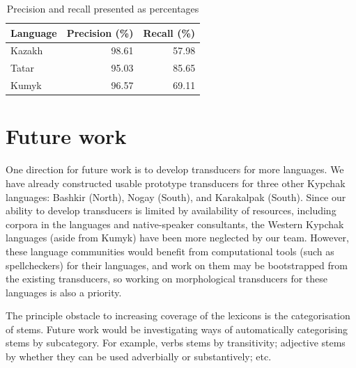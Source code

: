 \documentclass[a4paper,11pt,twocolumn]{article}
\begin{document}


\begin{table}
\begin{center}
	\begin{tabular}{lrr}
	\toprule
		\textbf{Language} & \textbf{Precision (\%)} & \textbf{Recall (\%)} \\
	\midrule
		Kazakh & 98.61 &  57.98 \\
		Tatar & 95.03 & 85.65 \\
		Kumyk & 96.57 & 69.11 \\
	\bottomrule
	\end{tabular}
	\caption{Precision and recall presented as percentages}
	\label{table:precrecall}
\end{center}
\vspace{-1.5em}
\end{table}


\section{Future work}


One direction for future work is to develop transducers for more languages.  We have already constructed usable prototype transducers for three other Kypchak languages: Bashkir (North), Nogay (South), and Karakalpak (South).  Since our ability to develop transducers is limited by availability of resources, including corpora in the languages and native-speaker consultants, the Western Kypchak languages (aside from Kumyk) have been more neglected by our team.  However, these language communities would benefit from computational tools (such as spellcheckers) for their languages, and work on them may be bootstrapped from the existing transducers, so working on morphological transducers for these languages is also a priority.

The principle obstacle to increasing coverage of the lexicons is the categorisation of stems. Future work would be investigating ways of automatically categorising stems by subcategory. For example, verbs stems by transitivity; adjective stems by whether  they can be used adverbially or substantively; etc. 
\end{document}
